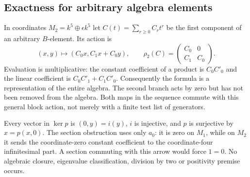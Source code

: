 \subsection{Exactness for arbitrary algebra elements}
In coordinates $M_2=k^5\oplus\epsilon k^5$ let
$C(t)=\sum_{r\geq0}C_rt^r$ be the first component of an arbitrary
$B$-element. Its action is
\[
 (x,y)\longmapsto(C_0x,C_1x+C_0y),\qquad
 \rho_2(C)=\begin{pmatrix}C_0&0\\C_1&C_0\end{pmatrix}.
\]
Evaluation is multiplicative: the constant coefficient of a product is
$C_0C'_0$ and the linear coefficient is $C_0C'_1+C_1C'_0$.
Consequently the formula is a representation of the entire algebra.
The second branch acts by zero but has not been removed from the algebra.
Both maps in the sequence commute with this general block action,
not merely with a finite test list of generators.

\begin{center}
\end{center}
Every vector in $\ker p$ is $(0,y)=i(y)$, $i$ is injective, and
$p$ is surjective by $x=p(x,0)$. The section obstruction uses only
$a_0$: it is zero on $M_1$, while on $M_2$ it sends the coordinate-zero
constant coefficient to the coordinate-four infinitesimal part. A section commuting
with this arrow would force $1=0$. No algebraic closure, eigenvalue
classification, division by two or positivity premise occurs.

